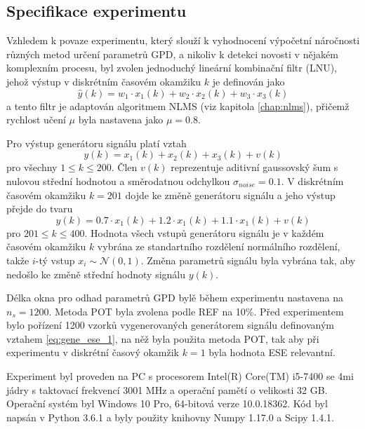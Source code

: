 \subsection{Specifikace experimentu}
Vzhledem k povaze experimentu, který slouží k vyhodnocení výpočetní náročnosti různých metod určení parametrů GPD, a nikoliv k detekci novosti v nějakém komplexním procesu, byl zvolen jednoduchý lineární kombinační filtr (LNU), jehož výstup v diskrétním časovém okamžiku $k$ je definován jako
\begin{equation}\label{eq:gene_ese_1}
\hat{y}(k)=w_1\cdot x_1(k)+w_2\cdot x_2(k)+w_3\cdot x_3(k)
\end{equation}
a tento filtr je adaptován algoritmem NLMS (viz kapitola \ref{chap:nlms}), přičemž rychlost učení $\mu$ byla nastavena jako $\mu=0.8$.
\par 
Pro výstup generátoru signálu platí vztah
\begin{equation}
y(k)=x_1(k)+x_2(k)+x_3(k)+v(k)
\end{equation}
pro všechny $1 \leq k \leq 200$. Člen $v(k)$ reprezentuje aditivní gaussovský šum s nulovou střední hodnotou a směrodatnou odchylkou $\sigma_{noise}=0.1$. V diskrétním časovém okamžiku $k=201$ dojde ke změně generátoru signálu a jeho výstup přejde do tvaru
\begin{equation}
y(k)=0.7\cdot x_1(k)+1.2\cdot x_1(k)+1.1 \cdot x_1(k) + v(k)
\end{equation}
pro $201 \leq k \leq 400$. Hodnota všech vstupů generátoru signálu je v každém časovém okamžiku $k$ vybrána ze standartního rozdělení normálního rozdělení, takže $i$-tý vstup $x_i\sim \mathcal{N}(0,1)$. Změna parametrů signálu byla vybrána tak, aby nedošlo ke změně střední hodnoty signálu $y(k)$.
\par
Délka okna pro odhad parametrů GPD bylě během experimentu nastavena na $n_s=1200$. Metoda POT byla zvolena podle REF na 10\%. Před experimentem bylo pořízení 1200 vzorků vygenerovaných generátorem signálu definovaným vztahem \ref{eq:gene_ese_1}, na něž byla použita metoda POT, tak aby při experimentu v diskrétní časový okamžik $k=1$ byla hodnota ESE relevantní.
\par
Experiment byl proveden na PC s procesorem Intel(R) Core(TM) i5-7400 se 4mi jádry s taktovací frekvencí 3001 MHz a operační pamětí o velikosti 32 GB. Operační systém byl Windows 10 Pro, 64-bitová verze 10.0.18362. Kód byl napsán v Python 3.6.1 a byly použity knihovny Numpy 1.17.0 a Scipy 1.4.1.


